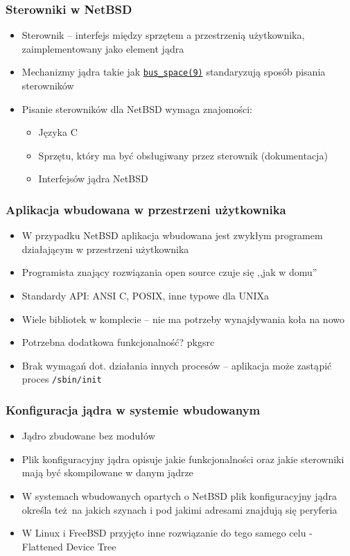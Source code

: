 \documentclass[dvipsnames,table]{beamer}
\begin{document}
\begin{frame}
\frametitle{Sterowniki w NetBSD}
\begin{itemize}
	\item Sterownik -- interfejs między sprzętem a przestrzenią użytkownika, zaimplementowany jako element jądra
	\item Mechanizmy jądra takie jak {\tt \href{http://netbsd.gw.com/cgi-bin/man-cgi?bus_space++NetBSD-current}{bus\_space(9)}} standaryzują sposób pisania sterowników
	\item Pisanie sterowników dla NetBSD wymaga znajomości:
	\begin{itemize}
		\item Języka C
		\item Sprzętu, który ma być obsługiwany przez sterownik (dokumentacja)
		\item Interfejsów jądra NetBSD
	\end{itemize}
\end{itemize}
\end{frame}

\begin{frame}
\frametitle{Aplikacja wbudowana w przestrzeni użytkownika}
\begin{itemize}
	\item W przypadku NetBSD aplikacja wbudowana jest zwykłym programem działającym w przestrzeni użytkownika
	\item Programista znający rozwiązania open source czuje się ,,jak w domu''
	\item Standardy API: ANSI C, POSIX, inne typowe dla UNIXa
	\item Wiele bibliotek w komplecie -- nie ma potrzeby wynajdywania koła na nowo
	\item Potrzebna dodatkowa funkcjonalność? pkgsrc
	\item Brak wymagań dot. działania innych procesów -- aplikacja może zastąpić proces {\tt /sbin/init}
\end{itemize}
\end{frame}

\begin{frame}
\frametitle{Konfiguracja jądra w systemie wbudowanym}
\begin{itemize}
	\item Jądro zbudowane bez modułów
	\item Plik konfiguracyjny jądra opisuje jakie funkcjonalności oraz jakie sterowniki mają być skompilowane w danym jądrze
	\item W systemach wbudowanych opartych o NetBSD plik konfiguracyjny jądra określa też na jakich szynach i pod jakimi adresami znajdują się peryferia
	\item W Linux i FreeBSD przyjęto inne rozwiązanie do tego samego celu - Flattened Device Tree
\end{itemize}
\end{frame}
\end{document}
